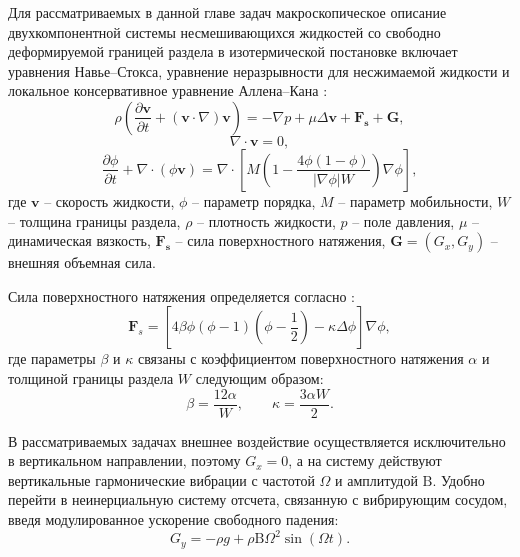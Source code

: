 \documentclass[12pt,a4paper]{article}
\begin{document}
Для рассматриваемых в данной главе задач макроскопическое описание двухкомпонентной системы несмешивающихся жидкостей со свободно деформируемой границей раздела в изотермической постановке включает уравнения Навье--Стокса, уравнение неразрывности для несжимаемой жидкости и локальное консервативное уравнение Аллена--Кана \cite{Inamuro2021, Sun2007, Liang2018}:
\begin{equation} \label{eq:Navier-Stokes_LBM}
	\rho \left(
	\frac{\partial \mathbf{v}}{\partial t}
	+ (\mathbf{v} \cdot \nabla)\mathbf{v}
	\right)
	=
	- \nabla p
	+ \mu \Delta \mathbf{v}
	+ \mathbf{F_s}
	+ \mathbf{G},
\end{equation}
\begin{equation}
	\nabla \cdot \mathbf{v} = 0,
\end{equation}
\begin{equation}
	\frac{\partial \phi}{\partial t}
	+ \nabla \cdot (\phi \mathbf{v})
	=
	\nabla \cdot
	\left[
	M \left(
	1 - \frac{4\phi\left(1-\phi\right)}{|\nabla \phi| W}
	\right)
	\nabla \phi
	\right],
\end{equation}
где $\mathbf{v}$ -- скорость жидкости, $\phi$ -- параметр порядка,  $M$ -- параметр мобильности, $W$ -- толщина границы раздела, $\rho$ -- плотность жидкости, $p$ -- поле давления, $\mu$ -- динамическая вязкость, $\mathbf{F_s}$ -- сила поверхностного натяжения, $\mathbf{G}=(G_x, G_y)$ -- внешняя объемная сила.

Сила поверхностного натяжения определяется согласно \cite{Geier2015, Liang2018}:
%
\begin{equation}
	\mathbf{F}_{s}
	=
	\left[
	4\beta \phi(\phi - 1)(\phi - \frac{1}{2})
	- \kappa \Delta \phi
	\right]
	\nabla \phi,
\end{equation}
%
где параметры $\beta$ и $\kappa$ связаны с коэффициентом поверхностного натяжения $\alpha$ и толщиной границы раздела $W$ следующим образом:
$$
\beta = \frac{12\alpha}{W},
\qquad
\kappa = \frac{3\alpha W}{2}.
$$


В рассматриваемых задачах внешнее воздействие осуществляется исключительно в вертикальном направлении, поэтому $G_x = 0$, а на систему действуют вертикальные гармонические вибрации с частотой $\Omega$ и амплитудой $\mathrm{B}$. Удобно перейти в неинерциальную систему отсчета, связанную с вибрирующим сосудом, введя модулированное ускорение свободного падения:
\begin{equation}\label{eq:vibro_force_LBM}
	G_y = - \rho g + \rho \mathrm{B} \Omega^2 \sin(\Omega t).
\end{equation}
\end{document}
